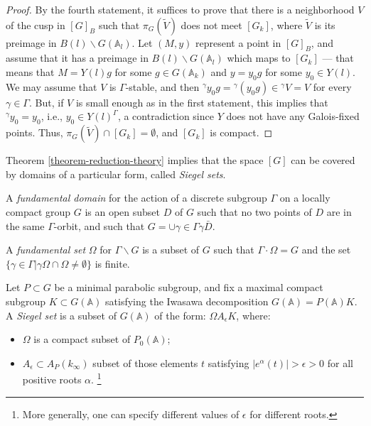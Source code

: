 \begin{proof}
 By the fourth statement, it suffices to prove that there is a neighborhood $V$ of the cusp in $[G]_B$ such that $\pi_G(\tilde V)$ does not meet $[G_k]$, where $\tilde V$ is its preimage in $B(l)\backslash G(\mathbb A_l)$. Let $(M,y)$ represent a point in $[G]_B$, and assume that it has a preimage in $B(l)\backslash G(\mathbb A_l)$ which maps to $[G_k]$ --- that means that $M = Y(l) g$ for some $g\in G(\mathbb A_k)$ and $y = y_0 g$ for some $y_0\in Y(l)$. We may assume that $V$ is $\Gamma$-stable, and then ${^\gamma y_0}g = {^\gamma(y_0g)}\in {^\gamma V} = V$ for every $\gamma\in \Gamma$. But, if $V$ is small enough as in the first statement, this implies that ${^\gamma y_0} = y_0$, i.e., $y_0 \in Y(l)^\Gamma$, a contradiction since $Y$ does not have any Galois-fixed points. Thus, $\pi_G(\tilde V)\cap [G_k] = \emptyset$, and $[G_k]$ is compact. 
 
\end{proof}



Theorem \ref{theorem-reduction-theory} implies that the space $[G]$ can be covered by domains of a particular form, called \emph{Siegel sets}.

\begin{definition}
 \label{definition-fundamental-set-domain}
A {\it fundamental domain} for the action of a discrete subgroup $\Gamma$ on a locally compact group $G$ is an open subset $D$ of $G$ such that no two points of $D$ are in the same $\Gamma$-orbit, and such that $G= \cup{\gamma\in \Gamma} \gamma \bar D$. 

A {\it fundamental set} $\Omega$ for $\Gamma\backslash G$ is a subset of $G$ such that $\Gamma\cdot \Omega= G$ and the set $\{\gamma\in \Gamma | \gamma \Omega \cap \Omega \neq \emptyset\}$ is finite. 
\end{definition}


\begin{definition}
 \label{definition-Siegel-set}
Let $P\subset G$ be a minimal parabolic subgroup, and fix a maximal compact subgroup $K\subset G(\mathbb A)$ satisfying the Iwasawa decomposition $G(\mathbb A)= P(\mathbb A) K$. A {\it Siegel set} is a subset of $G(\mathbb A)$ of the form: $\Omega A_\epsilon K$, where: 
\begin{itemize}
 \item $\Omega$ is a compact subset of $P_0(\mathbb A)$;
 \item $A_\epsilon\subset A_P(k_\infty)$ subset of those elements $t$ satisfying $|e^\alpha(t)|>\epsilon>0$ for all positive roots $\alpha$. \footnote{More generally, one can specify different values of $\epsilon$ for different roots.}
\end{itemize} 
\end{definition}

